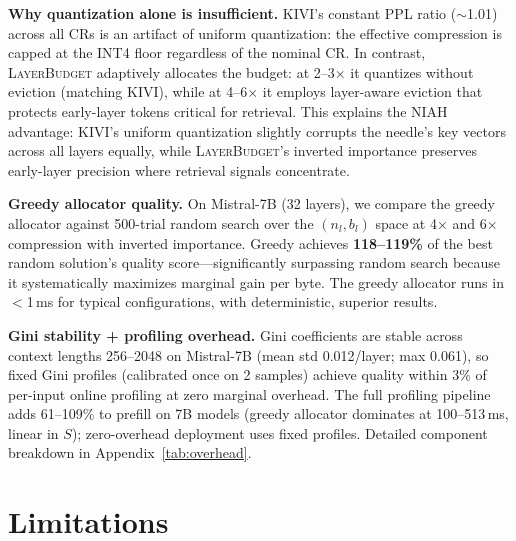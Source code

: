\documentclass{article}
\newcommand{\layerbudget}{\textsc{LayerBudget}\xspace}
\begin{document}
\textbf{Why quantization alone is insufficient.}
KIVI's constant PPL ratio ($\sim$1.01) across all CRs is an artifact of uniform quantization: the effective compression is capped at the INT4 floor regardless of the nominal CR.
In contrast, \layerbudget adaptively allocates the budget: at 2--3$\times$ it quantizes without eviction (matching KIVI), while at 4--6$\times$ it employs layer-aware eviction that protects early-layer tokens critical for retrieval.
This explains the NIAH advantage: KIVI's uniform quantization slightly corrupts the needle's key vectors across all layers equally, while \layerbudget's inverted importance preserves early-layer precision where retrieval signals concentrate.

\textbf{Greedy allocator quality.}
On Mistral-7B (32 layers), we compare the greedy allocator against 500-trial random search over the $(n_l, b_l)$ space at 4$\times$ and 6$\times$ compression with inverted importance.
Greedy achieves \textbf{118--119\%} of the best random solution's quality score---significantly surpassing random search because it systematically maximizes marginal gain per byte.
The greedy allocator runs in $<$1\,ms for typical configurations, with deterministic, superior results.

\textbf{Gini stability + profiling overhead.}
Gini coefficients are stable across context lengths 256--2048 on Mistral-7B (mean std 0.012/layer; max 0.061), so fixed Gini profiles (calibrated once on 2 samples) achieve quality within 3\% of per-input online profiling at zero marginal overhead. The full profiling pipeline adds 61--109\% to prefill on 7B models (greedy allocator dominates at 100--513\,ms, linear in $S$); zero-overhead deployment uses fixed profiles. Detailed component breakdown in Appendix~\ref{tab:overhead}.

\section{Limitations}
\label{sec:limitations}
\end{document}

